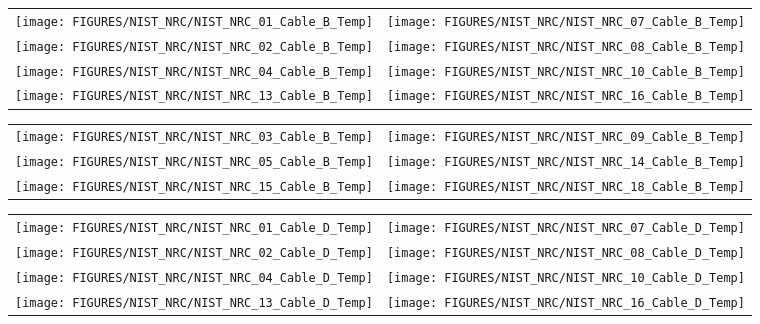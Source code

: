 \newpage

\begin{figure}[p]
\begin{tabular*}{\textwidth}{l@{\extracolsep{\fill}}r}
\texttt{[image: FIGURES/NIST\_NRC/NIST\_NRC\_01\_Cable\_B\_Temp]} &
\texttt{[image: FIGURES/NIST\_NRC/NIST\_NRC\_07\_Cable\_B\_Temp]} \\
\texttt{[image: FIGURES/NIST\_NRC/NIST\_NRC\_02\_Cable\_B\_Temp]} &
\texttt{[image: FIGURES/NIST\_NRC/NIST\_NRC\_08\_Cable\_B\_Temp]} \\
\texttt{[image: FIGURES/NIST\_NRC/NIST\_NRC\_04\_Cable\_B\_Temp]} &
\texttt{[image: FIGURES/NIST\_NRC/NIST\_NRC\_10\_Cable\_B\_Temp]} \\
\texttt{[image: FIGURES/NIST\_NRC/NIST\_NRC\_13\_Cable\_B\_Temp]} &
\texttt{[image: FIGURES/NIST\_NRC/NIST\_NRC\_16\_Cable\_B\_Temp]}
\end{tabular*}
\label{NIST_NRC_Cable_B_Closed}
\end{figure}

\begin{figure}[p]
\begin{tabular*}{\textwidth}{l@{\extracolsep{\fill}}r}
\texttt{[image: FIGURES/NIST\_NRC/NIST\_NRC\_03\_Cable\_B\_Temp]} &
\texttt{[image: FIGURES/NIST\_NRC/NIST\_NRC\_09\_Cable\_B\_Temp]} \\
\texttt{[image: FIGURES/NIST\_NRC/NIST\_NRC\_05\_Cable\_B\_Temp]} &
\texttt{[image: FIGURES/NIST\_NRC/NIST\_NRC\_14\_Cable\_B\_Temp]} \\
\texttt{[image: FIGURES/NIST\_NRC/NIST\_NRC\_15\_Cable\_B\_Temp]} &
\texttt{[image: FIGURES/NIST\_NRC/NIST\_NRC\_18\_Cable\_B\_Temp]}
\end{tabular*}
\label{NIST_NRC_Cable_B_Open}
\end{figure}

\begin{figure}[p]
\begin{tabular*}{\textwidth}{l@{\extracolsep{\fill}}r}
\texttt{[image: FIGURES/NIST\_NRC/NIST\_NRC\_01\_Cable\_D\_Temp]} &
\texttt{[image: FIGURES/NIST\_NRC/NIST\_NRC\_07\_Cable\_D\_Temp]} \\
\texttt{[image: FIGURES/NIST\_NRC/NIST\_NRC\_02\_Cable\_D\_Temp]} &
\texttt{[image: FIGURES/NIST\_NRC/NIST\_NRC\_08\_Cable\_D\_Temp]} \\
\texttt{[image: FIGURES/NIST\_NRC/NIST\_NRC\_04\_Cable\_D\_Temp]} &
\texttt{[image: FIGURES/NIST\_NRC/NIST\_NRC\_10\_Cable\_D\_Temp]} \\
\texttt{[image: FIGURES/NIST\_NRC/NIST\_NRC\_13\_Cable\_D\_Temp]} &
\texttt{[image: FIGURES/NIST\_NRC/NIST\_NRC\_16\_Cable\_D\_Temp]}
\end{tabular*}
\label{NIST_NRC_Cable_D_Closed}
\end{figure}


